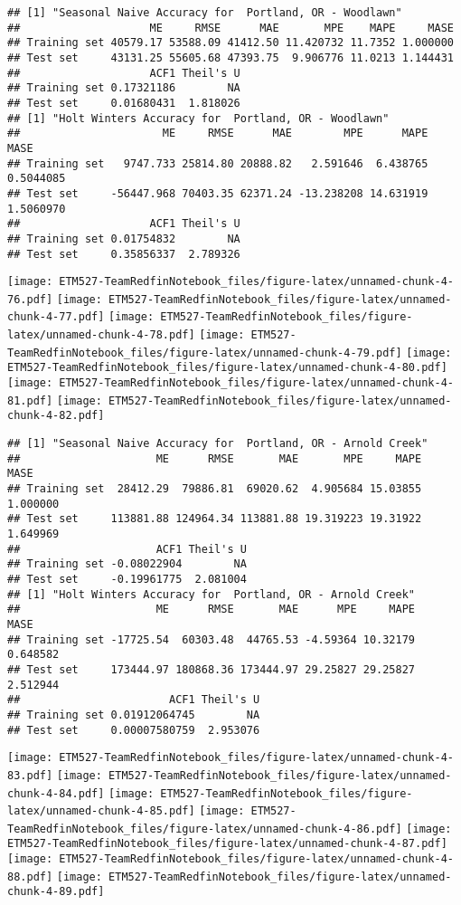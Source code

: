 \documentclass[]{article}
\begin{document}
\begin{verbatim}
## [1] "Seasonal Naive Accuracy for  Portland, OR - Woodlawn"
##                    ME     RMSE      MAE       MPE    MAPE     MASE
## Training set 40579.17 53588.09 41412.50 11.420732 11.7352 1.000000
## Test set     43131.25 55605.68 47393.75  9.906776 11.0213 1.144431
##                    ACF1 Theil's U
## Training set 0.17321186        NA
## Test set     0.01680431  1.818026
## [1] "Holt Winters Accuracy for  Portland, OR - Woodlawn"
##                      ME     RMSE      MAE        MPE      MAPE      MASE
## Training set   9747.733 25814.80 20888.82   2.591646  6.438765 0.5044085
## Test set     -56447.968 70403.35 62371.24 -13.238208 14.631919 1.5060970
##                    ACF1 Theil's U
## Training set 0.01754832        NA
## Test set     0.35856337  2.789326
\end{verbatim}

\texttt{[image: ETM527-TeamRedfinNotebook\_files/figure-latex/unnamed-chunk-4-76.pdf]}
\texttt{[image: ETM527-TeamRedfinNotebook\_files/figure-latex/unnamed-chunk-4-77.pdf]}
\texttt{[image: ETM527-TeamRedfinNotebook\_files/figure-latex/unnamed-chunk-4-78.pdf]}
\texttt{[image: ETM527-TeamRedfinNotebook\_files/figure-latex/unnamed-chunk-4-79.pdf]}
\texttt{[image: ETM527-TeamRedfinNotebook\_files/figure-latex/unnamed-chunk-4-80.pdf]}
\texttt{[image: ETM527-TeamRedfinNotebook\_files/figure-latex/unnamed-chunk-4-81.pdf]}
\texttt{[image: ETM527-TeamRedfinNotebook\_files/figure-latex/unnamed-chunk-4-82.pdf]}

\begin{verbatim}
## [1] "Seasonal Naive Accuracy for  Portland, OR - Arnold Creek"
##                     ME      RMSE       MAE       MPE     MAPE     MASE
## Training set  28412.29  79886.81  69020.62  4.905684 15.03855 1.000000
## Test set     113881.88 124964.34 113881.88 19.319223 19.31922 1.649969
##                     ACF1 Theil's U
## Training set -0.08022904        NA
## Test set     -0.19961775  2.081004
## [1] "Holt Winters Accuracy for  Portland, OR - Arnold Creek"
##                     ME      RMSE       MAE      MPE     MAPE     MASE
## Training set -17725.54  60303.48  44765.53 -4.59364 10.32179 0.648582
## Test set     173444.97 180868.36 173444.97 29.25827 29.25827 2.512944
##                       ACF1 Theil's U
## Training set 0.01912064745        NA
## Test set     0.00007580759  2.953076
\end{verbatim}

\texttt{[image: ETM527-TeamRedfinNotebook\_files/figure-latex/unnamed-chunk-4-83.pdf]}
\texttt{[image: ETM527-TeamRedfinNotebook\_files/figure-latex/unnamed-chunk-4-84.pdf]}
\texttt{[image: ETM527-TeamRedfinNotebook\_files/figure-latex/unnamed-chunk-4-85.pdf]}
\texttt{[image: ETM527-TeamRedfinNotebook\_files/figure-latex/unnamed-chunk-4-86.pdf]}
\texttt{[image: ETM527-TeamRedfinNotebook\_files/figure-latex/unnamed-chunk-4-87.pdf]}
\texttt{[image: ETM527-TeamRedfinNotebook\_files/figure-latex/unnamed-chunk-4-88.pdf]}
\texttt{[image: ETM527-TeamRedfinNotebook\_files/figure-latex/unnamed-chunk-4-89.pdf]}
\end{document}
